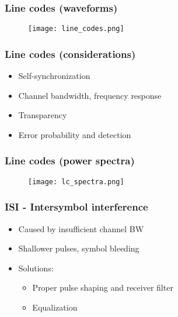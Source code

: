 \documentclass{beamer}
\begin{document}
	\begin{frame}
		\frametitle{Line codes (waveforms)}
		\begin{figure}
			\texttt{[image: line\_codes.png]}
		\end{figure}
	\end{frame}

	\begin{frame}
		\frametitle{Line codes (considerations)}
		\begin{itemize}
			\item Self-synchronization
			\item Channel bandwidth, frequency response
			\item Transparency
			\item Error probability and detection
		\end{itemize}
	\end{frame}

	\begin{frame}
		\frametitle{Line codes (power spectra)}
		\begin{figure}
			\texttt{[image: lc\_spectra.png]}
		\end{figure}
	\end{frame}

	\begin{frame}
		\frametitle{ISI - Intersymbol interference}
		\begin{itemize}
			\item Caused by insufficient channel BW
			\item Shallower pulses, symbol bleeding
			\item Solutions:
			\begin{itemize}
				\item Proper pulse shaping and receiver filter
				\item Equalization
			\end{itemize}
		\end{itemize}
	\end{frame}
\end{document}
